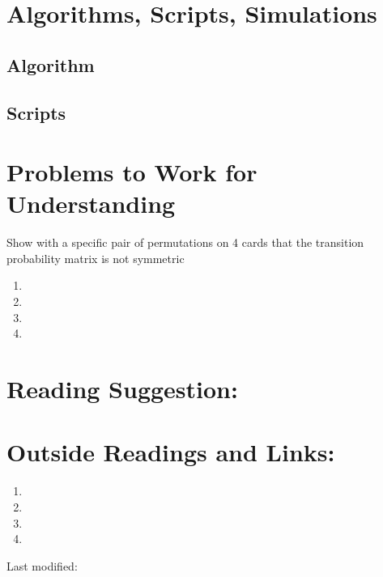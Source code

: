 \documentclass[12pt]{article}
\begin{document}
\section*{Algorithms, Scripts, Simulations}

\subsection*{Algorithm}

\subsection*{Scripts}

% 

\hr

\section*{Problems to Work for Understanding}
\begin{exercise}
  Show with a specific pair of permutations on 4 cards that the
  transition probability matrix is not symmetric
\end{exercise}
\begin{enumerate}
    \item
    \item
    \item
    \item
\end{enumerate}


\hr

\section*{Reading Suggestion:}




\hr

\section*{Outside Readings and Links:}
\begin{enumerate}
    \item
    \item
    \item
    \item
\end{enumerate}

\hr

\mydisclaim \myfooter

Last modified:  \flastmod
\end{document}
